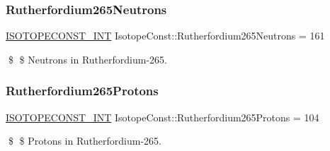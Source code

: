 \subsubsection{\texorpdfstring{Rutherfordium265\+Neutrons}{Rutherfordium265Neutrons}}
{\footnotesize\ttfamily \mbox{\hyperlink{group___isotope_const-_macros_ga5f18360b3e99483a35c32d789e62621c}{I\+S\+O\+T\+O\+P\+E\+C\+O\+N\+S\+T\+\_\+\+I\+NT}} Isotope\+Const\+::\+Rutherfordium265\+Neutrons = 161}

\$ \$ Neutrons in Rutherfordium-\/265. \mbox{\label{group___isotope_const-_rutherfordium-_rf265_gac147c473755271dac1c5a95c4655d43b}} 
\subsubsection{\texorpdfstring{Rutherfordium265\+Protons}{Rutherfordium265Protons}}
{\footnotesize\ttfamily \mbox{\hyperlink{group___isotope_const-_macros_ga5f18360b3e99483a35c32d789e62621c}{I\+S\+O\+T\+O\+P\+E\+C\+O\+N\+S\+T\+\_\+\+I\+NT}} Isotope\+Const\+::\+Rutherfordium265\+Protons = 104}

\$ \$ Protons in Rutherfordium-\/265. 